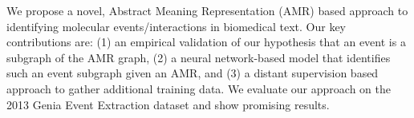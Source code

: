 We propose a novel, Abstract Meaning Representation (AMR) based approach to identifying molecular events/interactions in biomedical text. Our key contributions are: (1) an empirical validation of our hypothesis that an event is a subgraph of the AMR graph, (2) a neural network-based model that identifies such an event subgraph given an AMR, and (3) a distant supervision based approach to gather additional training data. We evaluate our approach on the 2013 Genia Event Extraction dataset and show promising results.
